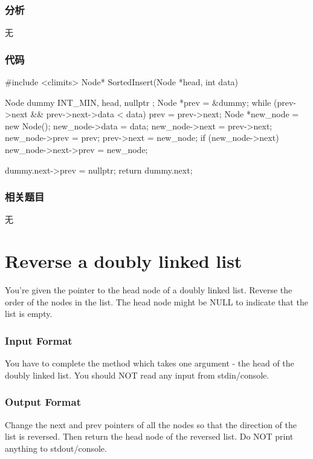 \subsubsection{分析}
无


\subsubsection{代码}
\begin{Code}
#include <climits>
Node* SortedInsert(Node *head, int data) {
    Node dummy{ INT_MIN, head, nullptr };
    Node *prev = &dummy;
    while (prev->next && prev->next->data < data) {
        prev = prev->next;
    }
    Node *new_node = new Node();
    new_node->data = data;
    new_node->next = prev->next;
    new_node->prev = prev;
    prev->next = new_node;
    if (new_node->next) new_node->next->prev = new_node;
    
    dummy.next->prev = nullptr;
    return dummy.next;
}
\end{Code}


\subsubsection{相关题目}
\begindot
\item 无
\myenddot


\section{Reverse a doubly linked list} %
\label{sec:Reverse-a-doubly-linked-list}

You’re given the pointer to the head node of a doubly linked list. Reverse the order of the nodes in the list. The head node might be NULL to indicate that the list is empty.


\subsubsection{Input Format}
You have to complete the  method which takes one argument - the head of the doubly linked list. You should NOT read any input from stdin/console.


\subsubsection{Output Format}
Change the next and prev pointers of all the nodes so that the direction of the list is reversed. Then return the head node of the reversed list. Do NOT print anything to stdout/console.


